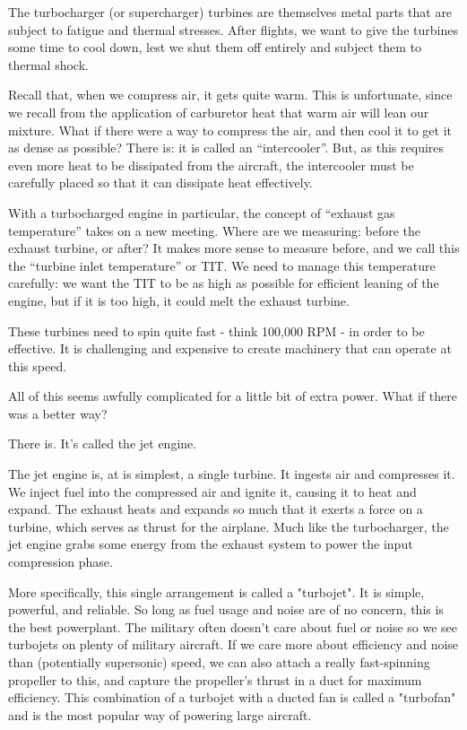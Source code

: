The turbocharger (or supercharger) turbines are themselves metal parts that are subject to fatigue and thermal stresses. After flights, we want to give the turbines some time to cool down, lest we shut them off entirely and subject them to thermal shock.

Recall that, when we compress air, it gets quite warm. This is unfortunate, since we recall from the application of carburetor heat that warm air will lean our mixture. What if there were a way to compress the air, and then cool it to get it as dense as possible? There is: it is called an ``intercooler''. But, as this requires even more heat to be dissipated from the aircraft, the intercooler must be carefully placed so that it can dissipate heat effectively.

With a turbocharged engine in particular, the concept of ``exhaust gas temperature'' takes on a new meeting. Where are we measuring: before the exhaust turbine, or after? It makes more sense to measure before, and we call this the ``turbine inlet temperature'' or TIT. We need to manage this temperature carefully: we want the TIT to be as high as possible for efficient leaning of the engine, but if it is too high, it could melt the exhaust turbine.

These turbines need to spin quite fast - think 100,000 RPM - in order to be effective. It is challenging and expensive to create machinery that can operate at this speed.

All of this seems awfully complicated for a little bit of extra power. What if there was a better way?

There is. It's called the jet engine.

The jet engine is, at is simplest, a single turbine. It ingests air and compresses it. We inject fuel into the compressed air and ignite it, causing it to heat and expand. The exhaust heats and expands so much that it exerts a force on a turbine, which serves as thrust for the airplane. Much like the turbocharger, the jet engine grabs some energy from the exhaust system to power the input compression phase.

More specifically, this single arrangement is called a "turbojet". It is simple, powerful, and reliable. So long as fuel usage and noise are of no concern, this is the best powerplant. The military often doesn't care about fuel or noise so we see turbojets on plenty of military aircraft. If we care more about efficiency and noise than (potentially supersonic) speed, we can also attach a really fast-spinning propeller to this, and capture the propeller's thrust in a duct for maximum efficiency. This combination of a turbojet with a ducted fan is called a "turbofan" and is the most popular way of powering large aircraft.

